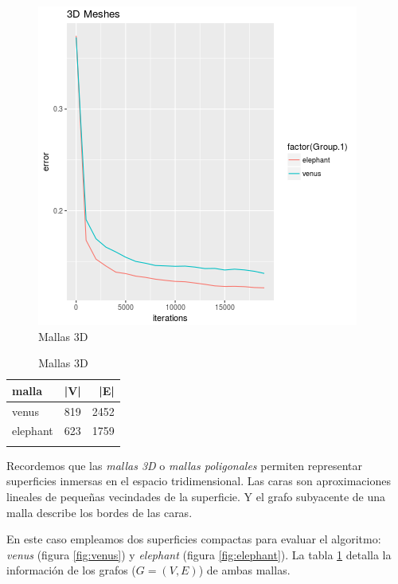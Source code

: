\documentclass[conference,compsoc,a4paper]{IEEEtran}
\begin{document}
\begin{figure}
	\includegraphics[width=\linewidth]{3dmeshes.png} %
	\caption{Mallas 3D}%
	\label{fig:meshes} %
\end{figure}

\begin{table}
	\caption{Mallas 3D}
	\centering
	\begin{tabular}{llr}
		\toprule
		malla & |V| & |E| \\
		\midrule
		venus & 819 & 2452 \\
		elephant & 623 & 1759 \\
		\bottomrule
		\label{tab:meshes}
	\end{tabular}
\end{table}

Recordemos que las \textit{mallas 3D} o \textit{mallas poligonales} 
permiten representar superficies inmersas en el espacio tridimensional. 
Las caras son aproximaciones lineales de pequeñas vecindades de la 
superficie. Y el grafo subyacente de una malla describe los bordes de 
las caras. 

\smallskip

En este caso empleamos dos superficies compactas para evaluar el 
algoritmo: \emph{venus} (figura \ref{fig:venus}) y \emph{elephant} 
(figura \ref{fig:elephant}). La tabla \ref{tab:meshes} detalla la 
información de los grafos ($G=(V,E)$) de ambas mallas.
\end{document}
